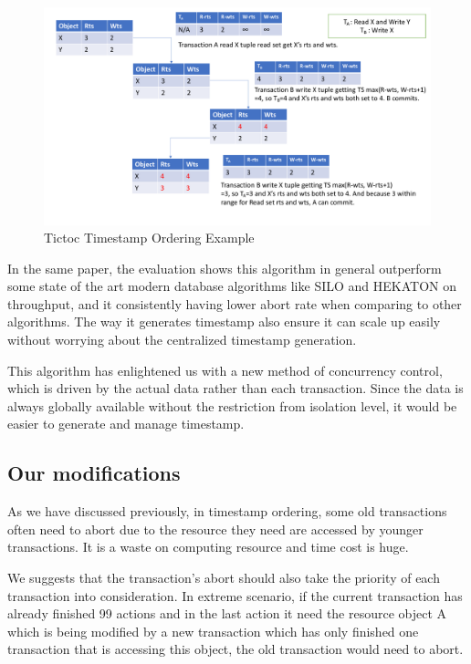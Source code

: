 \begin{figure}[H]
	\centering
	\includegraphics[width=0.9\linewidth]{tictocTO.pdf}
	\caption{Tictoc Timestamp Ordering Example}
\end{figure}

In the same paper, the evaluation shows this algorithm in general outperform some state of the art modern database algorithms like SILO\cite{xia2011silo} and HEKATON\cite{diaconu2013hekaton} on throughput, and it consistently having lower abort rate when comparing to other algorithms. The way it generates timestamp also ensure it can scale up easily without worrying about the centralized timestamp generation.

This algorithm has enlightened us with a new method of concurrency control, which is driven by the actual data rather than each transaction. Since the data is always globally available without the restriction from isolation level, it would be easier to generate and manage timestamp.

\subsection{Our modifications}

As we have discussed previously, in timestamp ordering, some old transactions often need to abort due to the resource they need are accessed by younger transactions. It is a waste on computing resource and time cost is huge.

We suggests that the transaction's abort should also take the priority of each transaction into consideration. In extreme scenario, if the current transaction has already finished 99 actions and in the last action it need the resource object A which is being modified by a new transaction which has only finished one transaction that is accessing this object, the old transaction would need to abort.

